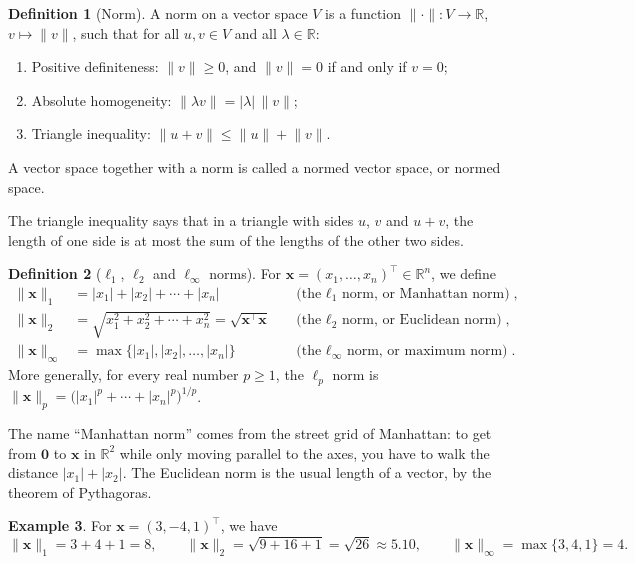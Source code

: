 \documentclass[11pt]{article}
\newcommand{\norm}[1]{\lVert #1 \rVert}
\theoremstyle{definition}
\newtheorem{definition}{Definition}[section]
\newtheorem{example}[definition]{Example}
\theoremstyle{plain}
\theoremstyle{remark}
\begin{document}
\begin{definition}[Norm]\label{def:norm}
    A norm on a vector space $V$ is a function $\norm{\cdot}: V \to \mathbb{R}$, $v \mapsto \norm{v}$, such that for all $u, v \in V$ and all $\lambda \in \mathbb{R}$:
    \begin{enumerate}
        \item Positive definiteness: $\norm{v} \geq 0$, and $\norm{v} = 0$ if and only if $v = 0$;
        \item Absolute homogeneity: $\norm{\lambda v} = |\lambda| \, \norm{v}$;
        \item Triangle inequality: $\norm{u + v} \leq \norm{u} + \norm{v}$.
    \end{enumerate}
    A vector space together with a norm is called a normed vector space, or normed space.
\end{definition}

The triangle inequality says that in a triangle with sides $u$, $v$ and $u + v$, the length of one side is at most the sum of the lengths of the other two sides.

\begin{definition}[$\ell_1$, $\ell_2$ and $\ell_\infty$ norms]\label{def:lp}
    For $\mathbf{x} = (x_1, \ldots, x_n)^\top \in \mathbb{R}^n$, we define
    \begin{align*}
        \norm{\mathbf{x}}_1 &= |x_1| + |x_2| + \cdots + |x_n| && \text{(the $\ell_1$ norm, or Manhattan norm)}, \\
        \norm{\mathbf{x}}_2 &= \sqrt{x_1^2 + x_2^2 + \cdots + x_n^2} = \sqrt{\mathbf{x}^\top \mathbf{x}} && \text{(the $\ell_2$ norm, or Euclidean norm)}, \\
        \norm{\mathbf{x}}_\infty &= \max\{|x_1|, |x_2|, \ldots, |x_n|\} && \text{(the $\ell_\infty$ norm, or maximum norm)}.
    \end{align*}
    More generally, for every real number $p \geq 1$, the $\ell_p$ norm is $\norm{\mathbf{x}}_p = \big(|x_1|^p + \cdots + |x_n|^p\big)^{1/p}$.
\end{definition}

The name ``Manhattan norm'' comes from the street grid of Manhattan: to get from $\mathbf{0}$ to $\mathbf{x}$ in $\mathbb{R}^2$ while only moving parallel to the axes, you have to walk the distance $|x_1| + |x_2|$. The Euclidean norm is the usual length of a vector, by the theorem of Pythagoras.

\begin{example}
    For $\mathbf{x} = (3, -4, 1)^\top$, we have
    \[\norm{\mathbf{x}}_1 = 3 + 4 + 1 = 8, \qquad \norm{\mathbf{x}}_2 = \sqrt{9 + 16 + 1} = \sqrt{26} \approx 5.10, \qquad \norm{\mathbf{x}}_\infty = \max\{3, 4, 1\} = 4.\]
\end{example}
\end{document}
